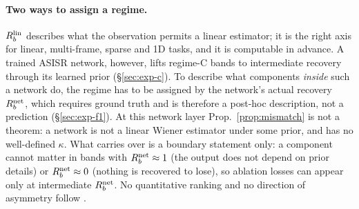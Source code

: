 \paragraph{Two ways to assign a regime.}
$R_b^{\mathrm{lin}}$ describes what the observation permits a linear estimator; it is the
right axis for linear, multi-frame, sparse and 1D tasks, and it is computable
in advance. A trained ASISR network, however, lifts regime-C bands to
intermediate recovery through its learned prior (\S\ref{sec:exp-c}). To
describe what components \emph{inside} such a network do, the regime has to
be assigned by the network's actual recovery $R_b^{\mathrm{net}}$, which requires ground
truth and is therefore a post-hoc description, not a prediction
(\S\ref{sec:exp-f1}).
At this network layer Prop.~\ref{prop:mismatch} is not a theorem: a network
is not a linear Wiener estimator under some prior, and has no well-defined
$\kappa$. What carries over is a boundary statement only: a component cannot
matter in bands with $R_b^{\mathrm{net}}\approx1$ (the output does not depend on prior
details) or $R_b^{\mathrm{net}}\approx0$ (nothing is recovered to lose), so ablation losses
can appear only at intermediate $R_b^{\mathrm{net}}$. No quantitative ranking and no
direction of asymmetry follow .
